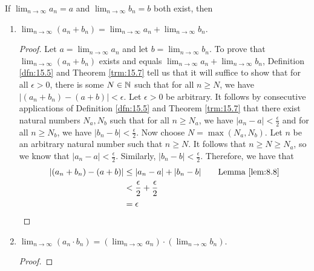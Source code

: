 \documentclass[../main.tex]{subfiles}
\begin{document}
\begin{theorem}\label{trm:15.9}
    If $\lim_{n\to\infty}a_n=a$ and $\lim_{n\to\infty}b_n=b$ both exist, then
    \begin{enumerate}[label={\textup{(}\alph*\textup{)}},ref={\thetheorem\alph*}]
        \item \label{trm:15.9a}$\lim_{n\to\infty}(a_n+b_n)=\lim_{n\to\infty}a_n+\lim_{n\to\infty}b_n$.
        \begin{proof}
            Let $a=\lim_{n\to\infty}a_n$ and let $b=\lim_{n\to\infty}b_n$. To prove that $\lim_{n\to\infty}(a_n+b_n)$ exists and equals $\lim_{n\to\infty}a_n+\lim_{n\to\infty}b_n$, Definition \ref{dfn:15.5} and Theorem \ref{trm:15.7} tell us that it will suffice to show that for all $\epsilon>0$, there is some $N\in\mathbb{N}$ such that for all $n\geq N$, we have $|(a_n+b_n)-(a+b)|<\epsilon$. Let $\epsilon>0$ be arbitrary. It follows by consecutive applications of Definition \ref{dfn:15.5} and Theorem \ref{trm:15.7} that there exist natural numbers $N_a,N_b$ such that for all $n\geq N_a$, we have $|a_n-a|<\frac{\epsilon}{2}$ and for all $n\geq N_b$, we have $|b_n-b|<\frac{\epsilon}{2}$. Now choose $N=\max(N_a,N_b)$. Let $n$ be an arbitrary natural number such that $n\geq N$. It follows that $n\geq N\geq N_a$, so we know that $|a_n-a|<\frac{\epsilon}{2}$. Similarly, $|b_n-b|<\frac{\epsilon}{2}$. Therefore, we have that
            \begin{align*}
                |(a_n+b_n)-(a+b)| &\leq |a_n-a|+|b_n-b|\tag*{Lemma \ref{lem:8.8}}\\
                &< \frac{\epsilon}{2}+\frac{\epsilon}{2}\\
                &= \epsilon
            \end{align*}
        \end{proof}
        \item \label{trm:15.9b}$\lim_{n\to\infty}(a_n\cdot b_n)=\left( \lim_{n\to\infty}a_n \right)\cdot\left( \lim_{n\to\infty}b_n \right)$.
        \begin{proof}

\end{proof}
\end{enumerate}
\end{theorem}
\end{document}
